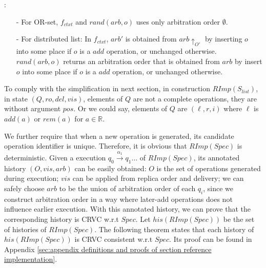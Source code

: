 
:

\begin{itemize}
\setlength{\itemsep}{0.5pt}
\item[-] {\color {red}For OR-set, $f_{\mathit{ctxt}}$ and $\mathit{rand}(\mathit{arb},o)$ uses only arbitration order $\emptyset$.}

\item[-] For distributed list: In $f_{\mathit{ctxt}}$, $\mathit{arb}'$ is obtained from $\mathit{arb} \uparrow_{O'}$ by inserting $o$ into some place if $o$ is a $add$ operation, or unchanged otherwise. $\mathit{rand}(\mathit{arb},o)$ returns an arbitration order that is obtained from $\mathit{arb}$ by insert $o$ into some place if $o$ is a $add$ operation, or unchanged otherwise.
\end{itemize} 

{\color {red}
\begin{remark}
\label{remark: RImp for list}
To comply with the simplification in next section, in construction $\mathit{RImp}(S_{\mathit{list}})$, in state $(Q,\mathit{ro},\mathit{del},\mathit{vis})$, elements of $Q$ are not a complete operations, they are without argument $\mathit{pos}$. Or we could say, elements of $Q$ are $(\ell,r,i)$ where $\ell$ is ${add}(a)$ or $\mathit{rem}(a)$ for $a \in \mathbb{R}$.
\end{remark}
}


We further require that when a new operation is generated, its candidate operation identifier is unique. Therefore, it is obvious that $\mathit{RImp}(\mathit{Spec})$ is deterministic. {\color {red}Given a execution $q_0 {\xrightarrow{\alpha_1}} q_1 \ldots$ of $\mathit{RImp}(\mathit{Spec})$, its annotated history $(O,\mathit{vis},\mathit{arb})$ can be easily obtained: $O$ is the set of operations generated during execution; $\mathit{vis}$ can be applied from replica order and delivery; we can safely choose $\mathit{arb}$ to be the union of arbitration order of each $q_i$, since we construct arbitration order in a way where later-add operations does not influence earlier execution. With this annotated history, we can prove that the corresponding history is CRVC w.r.t $\mathit{Spec}$. Let $\mathit{his}(\mathit{RImp}(\mathit{Spec}))$ be the set of histories of $\mathit{RImp}(\mathit{Spec})$. The following theorem states that each history of $\mathit{his}(\mathit{RImp}(\mathit{Spec}))$ is CRVC consistent w.r.t $\mathit{Spec}$.} Its proof can be found in Appendix \ref{sec:appendix definitions and proofs of section reference implementation}.

